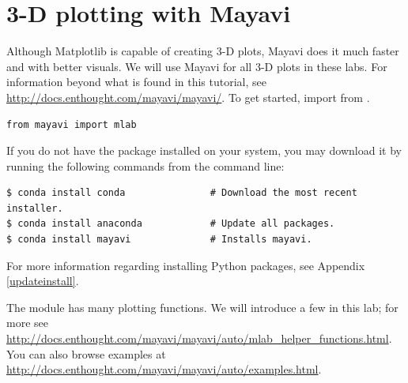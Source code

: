 \section*{3-D plotting with Mayavi}

Although Matplotlib is capable of creating 3-D plots, Mayavi does it much faster and with better visuals. 
We will use Mayavi for all 3-D plots in these labs. %
For information beyond what is found in this tutorial, see \url{http://docs.enthought.com/mayavi/mayavi/}.
To get started, import  from .

\begin{lstlisting}
from mayavi import mlab
\end{lstlisting}

\begin{info} %
If you do not have the  package installed on your system, you may download it by running the following commands from the command line:
\begin{lstlisting}
$ conda install conda               # Download the most recent installer.
$ conda install anaconda            # Update all packages.
$ conda install mayavi              # Installs mayavi.
\end{lstlisting}

For more information regarding installing Python packages, see Appendix \ref{updateinstall}.
\end{info}

The module  has many plotting functions.
We will introduce a few in this lab; for more see \url{http://docs.enthought.com/mayavi/mayavi/auto/mlab_helper_functions.html}.
You can also browse examples at \url{http://docs.enthought.com/mayavi/mayavi/auto/examples.html}.

